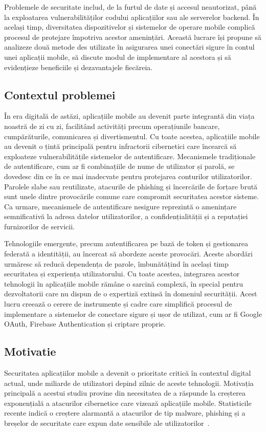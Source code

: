 \documentclass[runningheads]{llncs}
\begin{document}
Problemele de securitate includ, de la furtul de date și accesul neautorizat, până la exploatarea vulnerabilităților codului aplicațiilor sau ale serverelor backend. În același timp, diversitatea dispozitivelor și sistemelor de operare mobile complică procesul de protejare împotriva acestor amenințări. Această lucrare își propune să analizeze două metode des utilizate în asigurarea unei conectări sigure în contul unei aplicații mobile, să discute modul de implementare al acestora și să evidențieze beneficiile și dezavantajele fiecăreia.

\subsection{Contextul problemei}
În era digitală de astăzi, aplicațiile mobile au devenit parte integrantă din viața noastră de zi cu zi, facilitând activități precum operațiunile bancare, cumpărăturile, comunicarea și divertismentul. Cu toate acestea, aplicațiile mobile au devenit o țintă principală pentru infractorii cibernetici care încearcă să exploateze vulnerabilitățile sistemelor de autentificare. Mecanismele tradiționale de autentificare, cum ar fi combinațiile de nume de utilizator și parolă, se dovedesc din ce în ce mai inadecvate pentru protejarea conturilor utilizatorilor. Parolele slabe sau reutilizate, atacurile de phishing și încercările de forțare brută sunt unele dintre provocările comune care compromit securitatea acestor sisteme. Ca urmare, mecanismele de autentificare nesigure reprezintă o amenințare semnificativă la adresa datelor utilizatorilor, a confidențialității și a reputației furnizorilor de servicii.

Tehnologiile emergente, precum autentificarea pe bază de token și gestionarea federată a identității, au încercat să abordeze aceste provocări. Aceste abordări urmăresc să reducă dependența de parole, îmbunătățind în același timp securitatea și experiența utilizatorului. Cu toate acestea, integrarea acestor tehnologii în aplicațiile mobile rămâne o sarcină complexă, în special pentru dezvoltatorii care nu dispun de o expertiză extinsă în domeniul securității. Acest lucru creează o cerere de instrumente și cadre care simplifică procesul de implementare a sistemelor de conectare sigure și ușor de utilizat, cum ar fi Google OAuth, Firebase Authentication și criptare proprie.

\subsection{Motivatie}
Securitatea aplicațiilor mobile a devenit o prioritate critică în contextul digital actual, unde miliarde de utilizatori depind zilnic de aceste tehnologii. Motivația principală a acestui studiu provine din necesitatea de a răspunde la creșterea exponențială a atacurilor cibernetice care vizează aplicațiile mobile. Statisticile recente indică o creștere alarmantă a atacurilor de tip malware, phishing și a breșelor de securitate care expun date sensibile ale utilizatorilor~\cite{checkpoint}.
\end{document}
